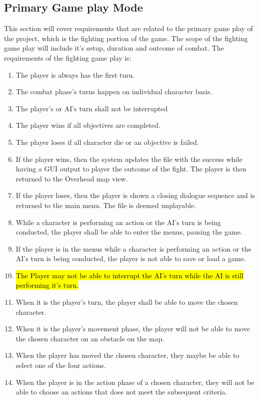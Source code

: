 \documentclass{article}
\begin{document}
\subsection{Primary Game play Mode}
\quad This section will cover requirements that are related to the primary game play of the project, which is the fighting portion of the game. The scope of the fighting game play will include it's setup, duration and outcome of combat. The requirements of the fighting game play is:
\begin{enumerate}[{PGR}1. ]
	\item The player is always has the first turn.
	\item The combat phase's turns happen on individual character basis.
	\item The player's or AI's turn shall not be interrupted
	\item The player wins if all objectives are completed.
	\item The player loses if all character die or an objective is failed.
	\item If the player wins, then the system updates the file with the success while having a GUI output to player the outcome of the fight. The player is then returned to the Overhead map view.
	\item If the player loses, then the player is shown a closing dialogue sequence and is returned to the main menu. The file is deemed unplayable.
	\item While a character is performing an action or the AI's turn is being conducted, the player shall be able to enter the menus, pausing the game.
	\item If the player is in the menus while a character is performing an action or the AI's turn is being conducted, the player is not able to save or load a game.
	\item \hl{The Player may not be able to interrupt the AI's turn while the AI is still performing it's turn.}
	\item When it is the player's turn, the player shall be able to move the chosen character.
	\item When it is the player's movement phase, the player will not be able to move the chosen character on an obstacle on the map.
	\item When the player has moved the chosen character, they maybe be able to select one of the four actions.
	\item When the player is in the action phase of a chosen character, they will not be able to choose an actions that does not meet the subsequent criteria.

\end{enumerate}
\end{document}
